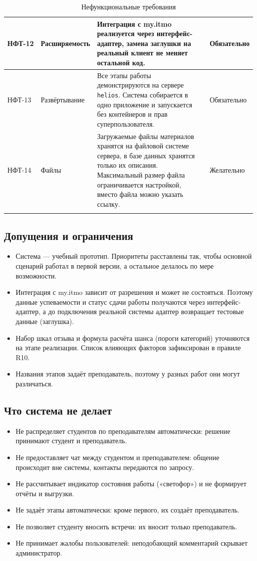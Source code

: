 \documentclass[a4paper,12pt]{article}
\begin{document}
{\begin{longtable}{|p{1.4cm}|p{2.6cm}|p{8.5cm}|p{2.2cm}|}
НФТ-12 & Расширяемость & Интеграция с my.itmo реализуется через интерфейс-адаптер, замена заглушки на реальный клиент не меняет остальной код. & Обязательно\\ \hline
НФТ-13 & Развёртывание & Все этапы работы демонстрируются на сервере \texttt{helios}. Система собирается в одно приложение и запускается без контейнеров и прав суперпользователя. & Обязательно\\ \hline
НФТ-14 & Файлы & Загружаемые файлы материалов хранятся на файловой системе сервера, в базе данных хранятся только их описания. Максимальный размер файла ограничивается настройкой, вместо файла можно указать ссылку. & Желательно\\ \hline
\caption{Нефункциональные требования}
\end{longtable}}

\subsection{Допущения и ограничения}
\begin{itemize}
  \item Система — учебный прототип. Приоритеты расставлены так, чтобы основной сценарий работал в первой версии, а остальное делалось по мере возможности.
  \item Интеграция с my.itmo зависит от разрешения и может не состояться. Поэтому данные успеваемости и статус сдачи работы получаются через интерфейс-адаптер, а до подключения реальной системы адаптер возвращает тестовые данные (заглушка).
  \item Набор шкал отзыва и формула расчёта шанса (пороги категорий) уточняются на этапе реализации. Список влияющих факторов зафиксирован в правиле R10.
  \item Названия этапов задаёт преподаватель, поэтому у разных работ они могут различаться.
\end{itemize}

\subsection{Что система не делает}\label{sec:out}
\begin{itemize}
  \item Не распределяет студентов по преподавателям автоматически: решение принимают студент и преподаватель.
  \item Не предоставляет чат между студентом и преподавателем: общение происходит вне системы, контакты передаются по запросу.
  \item Не рассчитывает индикатор состояния работы («светофор») и не формирует отчёты и выгрузки.
  \item Не задаёт этапы автоматически: кроме первого, их создаёт преподаватель.
  \item Не позволяет студенту вносить встречи: их вносит только преподаватель.
  \item Не принимает жалобы пользователей: неподобающий комментарий скрывает администратор.
\end{itemize}
\end{document}
